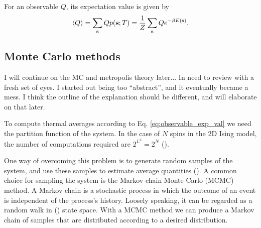 For an observable $Q$, its expectation value is given by 
\begin{equation}\label{eq:observable_exp_val}
    \expval{Q} = \sum_{\mathbf{s}} Q p(\mathbf{s};T) = \frac{1}{Z} \sum_\mathbf{s} Q e^{-\beta E(\mathbf{s})}.
\end{equation}


\subsection{Monte Carlo methods} \label{subsec_theory:MC_methods}
\alert{I will continue on the MC and metropolis theory later... In need to review with a fresh set of eyes. I started out being too ``abstract'', and it eventually became a mess. I think the outline of the explanation should be different, and will elaborate on that later.}



To compute thermal averages according to Eq. \eqref{eq:observable_exp_val} we need the partition function of the system. In the case of $N$ spins in the 2D Ising model, the number of computations required are $2^{L^2}=2^N$ ().  

One way of overcoming this problem is to generate random samples of the system, and use these samples to estimate average quantities (). A common choice for sampling the system is the Markov chain Monte Carlo (MCMC) method. A Markov chain is a stochastic process in which the outcome of an event is independent of the process's history. Loosely speaking, it can be regarded as a random walk in () state space. With a MCMC method we can produce a Markov chain of samples that are distributed according to a desired distribution.    

